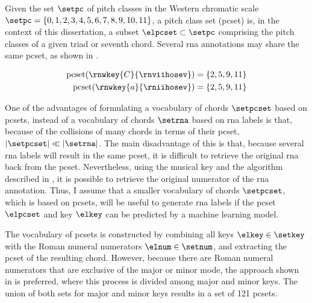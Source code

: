 
Given the set $\setpc$ of pitch classes in the Western
chromatic scale $\setpc = \{0, 1, 2, 3, 4, 5, 6, 7, 8, 9,
10, 11 \}$, a pitch class set (\gls{pcset}) is, in the
context of this dissertation, a subset $\elpcset \subset
\setpc$ comprising the pitch classes of a given triad or
seventh chord. Several \gls{rna} annotations may share the
same \gls{pcset}, as shown in .

\begin{equation}
    \label{eq:pcset_collision}
    \begin{split}
        \text{pcset}(\rnwkey{C}{\rnviihosev}) &= \{2, 5, 9, 11 \}\\
        \text{pcset}(\rnwkey{a}{\rniihosev}) &= \{2, 5, 9, 11 \}
    \end{split}
\end{equation}

One of the advantages of formulating a vocabulary of chords
$\setpcset$ based on \gls{pcset}s, instead of a vocabulary
of chords $\setrna$ based on \gls{rna} labels is that,
because of the collisions of many chords in terms of their
\gls{pcset}, $| \setpcset | \ll | \setrna |$. The main
disadvantage of this is that, because several \gls{rna}
labels will result in the same \gls{pcset}, it is difficult
to retrieve the original \gls{rna} back from the
\gls{pcset}. Nevertheless, using the musical key and the
algorithm described in
,
it is possible to retrieve the original numerator of the
\gls{rna} annotation. Thus, I assume that a smaller
vocabulary of chords $\setpcset$, which is based on
\gls{pcset}s, will be useful to generate \gls{rna} labels if
the \gls{pcset} $\elpcset$ and key $\elkey$ can be predicted
by a machine learning model.

The vocabulary of \gls{pcset}s is constructed by combining
all keys $\elkey \in \setkey$ with the Roman numeral
numerators $\elnum \in \setnum$, and extracting the
\gls{pcset} of the resulting chord. However, because there
are Roman numeral numerators that are exclusive of the major
or minor mode, the approach shown in  is
preferred, where this process is divided among major and
minor keys. The union of both sets for major and minor keys
results in a set of 121 \gls{pcset}s.


